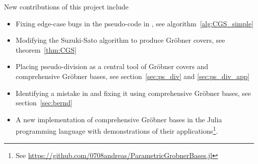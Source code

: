 New contributions of this project include
\begin{itemize}
  \item Fixing edge-case bugs in the pseudo-code in \cite{ss_algo}, see algorithm~\ref{alg:CGS_simple}
  \item Modifying the Suzuki-Sato algorithm to produce Gröbner covers, see theorem~\ref{thm:CGS}
  \item Placing pseudo-division as a central tool of Gröbner covers and comprehensive Gröbner bases, see section~\ref{sec:ps_div} and \ref{sec:ps_div_app}
  \item Identifying a mistake in \cite{sturmfels} and fixing it using comprehensive Gröbner bases, see section~\ref{sec:bernd}
  \item A new implementation of comprehensive Gröbner bases in the Julia programming language with demonstrations of their applications\footnote{See \url{https://github.com/0708andreas/ParametricGrobnerBases.jl}}.
\end{itemize}
